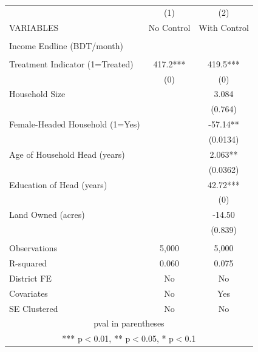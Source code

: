 \documentclass[]{article}
\begin{document}
\begin{tabular}{lcc} \hline
 & (1) & (2) \\
VARIABLES & No Control & With Control \\ \hline
 &  &  \\
Income Endline (BDT/month) &  &  \\
 &  &  \\
Treatment Indicator (1=Treated) & 417.2*** & 419.5*** \\
 & (0) & (0) \\
Household Size &  & 3.084 \\
 &  & (0.764) \\
Female-Headed Household (1=Yes) &  & -57.14** \\
 &  & (0.0134) \\
Age of Household Head (years) &  & 2.063** \\
 &  & (0.0362) \\
Education of Head (years) &  & 42.72*** \\
 &  & (0) \\
Land Owned (acres) &  & -14.50 \\
 &  & (0.839) \\
 &  &  \\
Observations & 5,000 & 5,000 \\
R-squared & 0.060 & 0.075 \\
District FE & No & No \\
Covariates & No & Yes \\
 SE Clustered & No & No \\ \hline
\multicolumn{3}{c}{ pval in parentheses} \\
\multicolumn{3}{c}{ *** p$<$0.01, ** p$<$0.05, * p$<$0.1} \\
\end{tabular}
\end{document}
